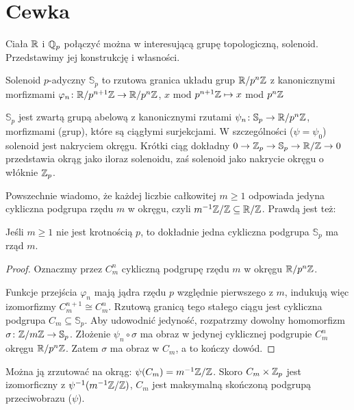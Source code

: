 \section{Cewka}
Ciała  $\mathbb R$ i $\mathbb Q_p$ połączyć można w interesującą grupę topologiczną, solenoid.
Przedstawimy jej konstrukcję i własności.


\begin{definicja}
	{Solenoid $p$-adyczny} $\mathbb S_p$ to rzutowa granica układu grup $\mathbb R/p^n\mathbb Z$ z kanonicznymi morfizmami $\varphi_n \colon \mathbb R/p^{n+1} \mathbb Z \to \mathbb R/p^n\mathbb Z$, $x$ mod $p^{n+1} \mathbb Z \mapsto x$ mod $p^n \mathbb Z$
\end{definicja}

$\mathbb S_p$ jest zwartą grupą abelową z kanonicznymi rzutami $\psi_n \colon \mathbb S_p \to \mathbb R/p^n\mathbb Z$, morfizmami (grup), które są ciągłymi surjekcjami.
W szczególności ($\psi = \psi_0$) solenoid jest nakryciem okręgu.
Krótki ciąg dokładny $0 \to \mathbb Z_p \to \mathbb S_p \to \mathbb R/\mathbb Z \to 0$ przedstawia okrąg jako iloraz solenoidu, zaś solenoid jako nakrycie okręgu o włóknie $\mathbb Z_p$.

Powszechnie  wiadomo, że każdej liczbie całkowitej $m \ge 1$ odpowiada jedyna cykliczna podgrupa rzędu $m$ w okręgu, czyli $m^{-1} \mathbb Z/\mathbb Z \subseteq \mathbb R/\mathbb Z$.
Prawdą jest też:

\begin{fakt}
	Jeśli $m \ge 1$ nie jest krotnością $p$, to dokładnie jedna cykliczna podgrupa $\mathbb S_p$ ma rząd $m$.
\end{fakt}

\begin{proof}
	Oznaczmy przez $C_m^n$ cykliczną podgrupę rzędu $m$ w okręgu $\mathbb R/p^n \mathbb Z$. 
	
	Funkcje przejścia $\varphi_n$ mają jądra rzędu $p$ względnie pierwszego z $m$, indukują więc izomorfizmy $C_m^{n+1} \cong C_m^n$.
	Rzutową granicą tego stałego ciągu jest cykliczna podgrupa $C_m \subseteq \mathbb S_p$.
	Aby udowodnić jedyność, rozpatrzmy dowolny homomorfizm $\sigma \colon \mathbb Z/m\mathbb Z \to \mathbb S_p$.
	Złożenie $\psi_n \circ\sigma$ ma obraz w jedynej cyklicznej podgrupie $C_m^n$ okręgu $\mathbb R/p^n\mathbb Z$.
	Zatem $\sigma$ ma obraz w $C_m$, a to kończy dowód.
\end{proof}

Można ją zrzutować na okrąg: $\psi(C_m) = m^{-1} \mathbb Z/\mathbb Z$.
Skoro $C_m \times \mathbb Z_p$ jest izomorficzny z $\psi^{-1} (m^{-1}\mathbb Z/\mathbb Z)$, $C_m$ jest maksymalną skończoną podgrupą przeciwobrazu ($\psi$).

